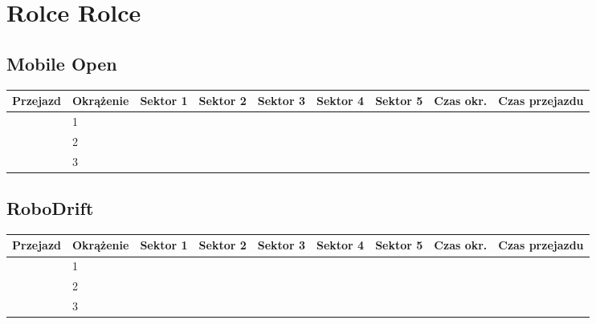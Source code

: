 \documentclass[11pt]{article}
\begin{document}
\section{Rolce Rolce}
\subsection{Mobile Open}
\begin{table}[h]
\begin{tabular}{|l|l|l|l|l|l|l|l|l|}
\hline
   Przejazd        & Okrążenie & Sektor 1 & Sektor 2 & Sektor 3 & Sektor 4 & Sektor 5 & Czas okr. & Czas przejazdu    \\ \hline
\multirow{3}{*}{} & 1         &          &          &          &          &          &           & \multirow{3}{*}{} \\ \cline{2-8}
                   & 2         &          &          &          &          &          &           &                  \\ \cline{2-8}
                   & 3         &          &          &          &          &          &           &                   \\ \hline
\end{tabular}
\end{table}
\subsection{RoboDrift}
\begin{table}[h]
\begin{tabular}{|l|l|l|l|l|l|l|l|l|}
\hline
   Przejazd        & Okrążenie & Sektor 1 & Sektor 2 & Sektor 3 & Sektor 4 & Sektor 5 & Czas okr. & Czas przejazdu    \\ \hline
\multirow{3}{*}{} & 1         &          &          &          &          &          &           & \multirow{3}{*}{} \\ \cline{2-8}
                   & 2         &          &          &          &          &          &           &                  \\ \cline{2-8}
                   & 3         &          &          &          &          &          &           &                   \\ \hline
\end{tabular}
\end{table}
\end{document}
